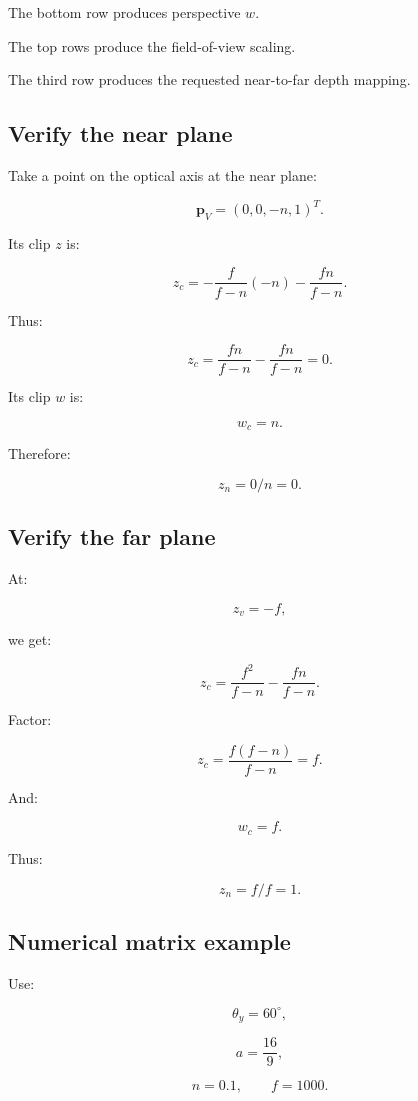 The bottom row produces perspective \(w\).

The top rows produce the field-of-view scaling.

The third row produces the requested near-to-far depth mapping.

\subsection{Verify the near plane}\label{02-foundations-ii-ch033-verify-the-near-plane}

Take a point on the optical axis at the near plane:

\[
 \mathbf p_V=(0,0,-n,1)^T.
\]

Its clip \(z\) is:

\[
 z_c= -\frac f{f-n}(-n)-\frac{fn}{f-n}.
\]

Thus:

\[
 z_c= \frac{fn}{f-n}-\frac{fn}{f-n}=0.
\]

Its clip \(w\) is:

\[
 w_c=n.
\]

Therefore:

\[
 \boxed{z_n=0/n=0}.
\]

\subsection{Verify the far plane}\label{02-foundations-ii-ch033-verify-the-far-plane}

At:

\[
 z_v=-f,
\]

we get:

\[
 z_c= \frac{f^2}{f-n}-\frac{fn}{f-n}.
\]

Factor:

\[
 z_c= \frac{f(f-n)}{f-n}=f.
\]

And:

\[
 w_c=f.
\]

Thus:

\[
 \boxed{z_n=f/f=1}.
\]

\subsection{Numerical matrix example}\label{02-foundations-ii-ch033-numerical-matrix-example}

Use:

\[
 \theta_y=60^\circ,
\]

\[
 a=\frac{16}{9},
\]

\[
 n=0.1,\qquad f=1000.
\]

